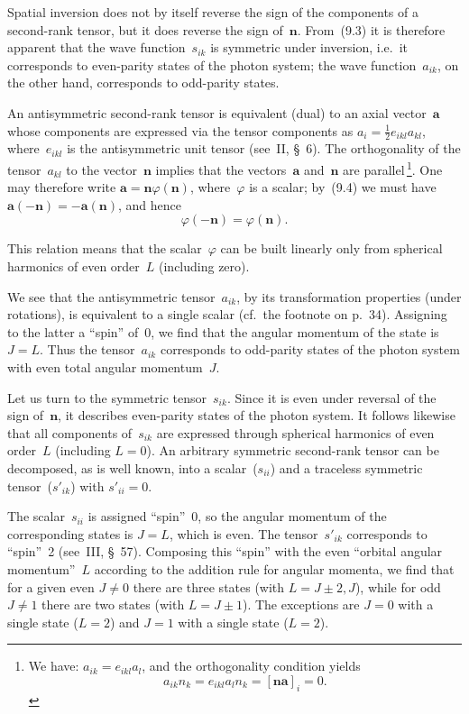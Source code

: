 Spatial inversion does not by itself reverse the sign of the components of a second-rank tensor, but it does reverse the sign of~$\mathbf{n}$. From~(9.3) it is therefore apparent that the wave function~$s_{ik}$ is symmetric under inversion, i.e.\ it corresponds to even-parity states of the photon system; the wave function~$a_{ik}$, on the other hand, corresponds to odd-parity states.

An antisymmetric second-rank tensor is equivalent (dual) to an axial vector~$\mathbf{a}$ whose components are expressed via the tensor components as $a_i = \tfrac{1}{2}e_{ikl}a_{kl}$, where~$e_{ikl}$ is the antisymmetric unit tensor (see~II, \S~6). The orthogonality of the tensor~$a_{kl}$ to the vector~$\mathbf{n}$ implies that the vectors~$\mathbf{a}$ and~$\mathbf{n}$ are parallel\,\footnote{We have: $a_{ik} = e_{ikl}a_l$, and the orthogonality condition yields
\[
a_{ik}n_k = e_{ikl}a_ln_k = [\mathbf{na}]_i = 0.
\]}. One may therefore write $\mathbf{a} = \mathbf{n}\varphi(\mathbf{n})$, where~$\varphi$ is a scalar; by~(9.4) we must have $\mathbf{a}(-\mathbf{n}) = -\mathbf{a}(\mathbf{n})$, and hence
\[
\varphi(-\mathbf{n}) = \varphi(\mathbf{n}).
\]

This relation means that the scalar~$\varphi$ can be built linearly only from spherical harmonics of even order~$L$ (including zero).

We see that the antisymmetric tensor~$a_{ik}$, by its transformation properties (under rotations), is equivalent to a single scalar (cf.\ the footnote on p.~34). Assigning to the latter a ``spin'' of~0, we find that the angular momentum of the state is $J = L$. Thus the tensor~$a_{ik}$ corresponds to odd-parity states of the photon system with even total angular momentum~$J$.

Let us turn to the symmetric tensor~$s_{ik}$. Since it is even under reversal of the sign of~$\mathbf{n}$, it describes even-parity states of the photon system. It follows likewise that all components of~$s_{ik}$ are expressed through spherical harmonics of even order~$L$ (including $L = 0$). An arbitrary symmetric second-rank tensor can be decomposed, as is well known, into a scalar~($s_{ii}$) and a traceless symmetric tensor~($s'_{ik}$) with $s'_{ii} = 0$.

The scalar~$s_{ii}$ is assigned ``spin''~0, so the angular momentum of the corresponding states is $J = L$, which is even. The tensor~$s'_{ik}$ corresponds to ``spin''~2 (see~III, \S~57). Composing this ``spin'' with the even ``orbital angular momentum''~$L$ according to the addition rule for angular momenta, we find that for a given even $J \neq 0$ there are three states (with $L = J \pm 2, J$), while for odd $J \neq 1$ there are two states (with $L = J \pm 1$). The exceptions are $J = 0$ with a single state ($L = 2$) and $J = 1$ with a single state ($L = 2$).

